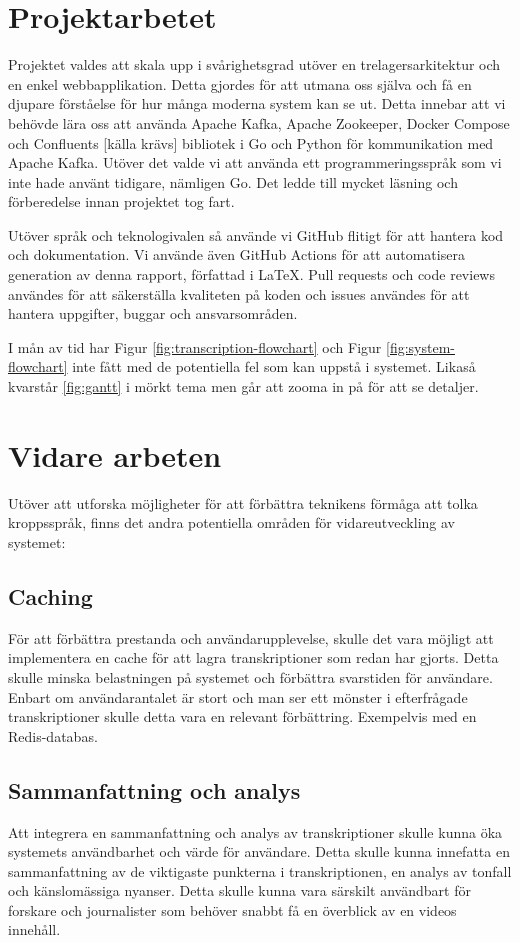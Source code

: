 \section{Projektarbetet}
Projektet valdes att skala upp i svårighetsgrad utöver en trelagersarkitektur
och en enkel webbapplikation. Detta gjordes för att utmana oss själva och
få en djupare förståelse för hur många moderna system kan se ut. Detta
innebar att vi behövde lära oss att använda Apache Kafka, Apache Zookeeper,
Docker Compose och Confluents [källa krävs] bibliotek i Go och Python för
kommunikation med Apache Kafka. Utöver det valde vi att använda ett
programmeringsspråk som vi inte hade använt tidigare, nämligen Go. Det ledde
till mycket läsning och förberedelse innan projektet tog fart. 

Utöver språk och teknologivalen så använde vi GitHub flitigt för att
hantera kod och dokumentation. Vi använde även GitHub Actions för att
automatisera generation av denna rapport, författad i \LaTeX. Pull requests
och code reviews användes för att säkerställa kvaliteten på koden och issues
användes för att hantera uppgifter, buggar och ansvarsområden.

I mån av tid har Figur \ref{fig:transcription-flowchart} och Figur 
\ref{fig:system-flowchart} inte fått med de potentiella fel som kan uppstå
i systemet. Likaså kvarstår \ref{fig:gantt} i mörkt tema men går att zooma in
på för att se detaljer.

\section{Vidare arbeten}
Utöver att utforska möjligheter för att förbättra teknikens förmåga att tolka
kroppsspråk, finns det andra potentiella områden för vidareutveckling av
systemet:

\subsection{Caching}
För att förbättra prestanda och användarupplevelse, skulle det vara möjligt
att implementera en cache för att lagra transkriptioner som redan har gjorts.
Detta skulle minska belastningen på systemet och förbättra svarstiden för
användare. Enbart om användarantalet är stort och man ser ett mönster i
efterfrågade transkriptioner skulle detta vara en relevant förbättring. 
Exempelvis med en Redis-databas. 

\subsection{Sammanfattning och analys}
Att integrera en sammanfattning och analys av transkriptioner skulle kunna
öka systemets användbarhet och värde för användare. Detta skulle kunna
innefatta en sammanfattning av de viktigaste punkterna i transkriptionen, en
analys av tonfall och känslomässiga nyanser. Detta skulle kunna vara särskilt
användbart för forskare och journalister som behöver snabbt få en överblick av
en videos innehåll.

